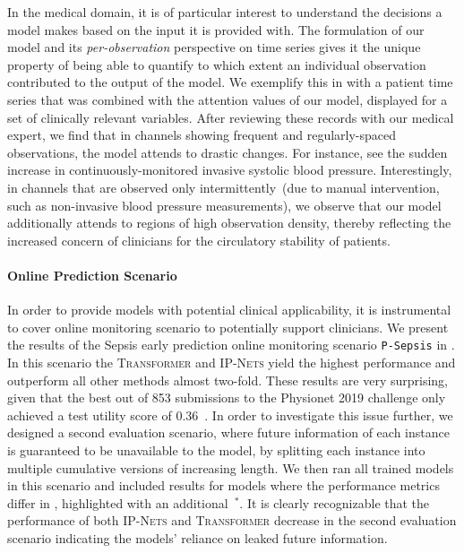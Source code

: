 \documentclass{article}
\newcommand{\dataset}[1]{\texttt{#1}}
\newcommand{\method}[1]{\textsc{#1}}
\begin{document}
In the medical domain, it is of particular interest to understand the decisions
a model makes based on the input it is provided with. The formulation of our
model and its \emph{per-observation} perspective on time series gives it the
unique property of being able to quantify to which extent an individual
observation contributed to the output of the model.
We exemplify this in  with a patient time
series that was combined with the attention values of our model, displayed for a set
of clinically relevant variables.
After reviewing these records with our medical expert, we find that in channels
showing frequent and regularly-spaced observations, the model attends to
drastic changes. For instance, see the sudden increase in continuously-monitored
invasive systolic blood pressure. Interestingly, in channels that are
observed only intermittently~(due to manual intervention, such as non-invasive
blood pressure measurements), we observe that our model additionally attends to
regions of high observation density, thereby reflecting the increased
concern of clinicians for the circulatory stability of patients.

\paragraph{Online Prediction Scenario}

In order to provide models with potential clinical applicability, it is
instrumental to cover online monitoring scenario to potentially support
clinicians. We present the results of the Sepsis early prediction online
monitoring scenario \dataset{P-Sepsis} in .
In this scenario the \method{Transformer} and \method{IP-Nets} yield the
highest performance and outperform all other methods almost two-fold.  These
results are very surprising, given that the best out of 853 submissions to the
Physionet 2019 challenge only achieved a test utility score of
$0.36$~\citep{reyna2020early}.  In order to investigate this issue further, we
designed a second evaluation scenario, where future information of each
instance is guaranteed to be unavailable to the model, by splitting each
instance into multiple cumulative versions of increasing length.  We then ran
all trained models in this scenario and included results for models where the
performance metrics differ in , highlighted with an
additional~$^*$.
It is clearly recognizable that the performance of both \method{IP-Nets}
and \method{Transformer} decrease in the second evaluation scenario
indicating the models' reliance on leaked future information. 
\end{document}
